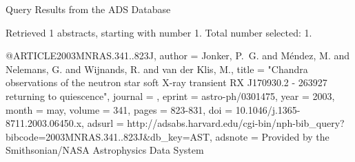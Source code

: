 Query Results from the ADS Database


Retrieved 1 abstracts, starting with number 1.  Total number selected: 1.

@ARTICLE{2003MNRAS.341..823J,
   author = {{Jonker}, P.~G. and {M{\'e}ndez}, M. and {Nelemans}, G. and 
	{Wijnands}, R. and {van der Klis}, M.},
    title = "{Chandra observations of the neutron star soft X-ray transient RX J170930.2 - 263927 returning to quiescence}",
  journal = {\mnras},
   eprint = {astro-ph/0301475},
     year = 2003,
    month = may,
   volume = 341,
    pages = {823-831},
      doi = {10.1046/j.1365-8711.2003.06450.x},
   adsurl = {http://adsabs.harvard.edu/cgi-bin/nph-bib_query?bibcode=2003MNRAS.341..823J&db_key=AST},
  adsnote = {Provided by the Smithsonian/NASA Astrophysics Data System}
}


